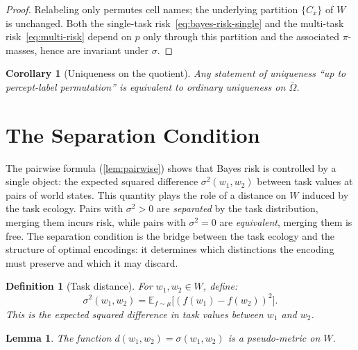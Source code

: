 \documentclass[12pt]{article}
\newtheorem{lemma}[theorem]{Lemma}
\newtheorem{corollary}[theorem]{Corollary}
\newtheorem{definition}[theorem]{Definition}
\newcommand{\sigmasq}{\sigma^2}
\newcommand{\E}{\mathbb{E}}
\newcommand{\Obar}{\bar{\Omega}}
\begin{document}
\begin{proof}
Relabeling only permutes cell names; the underlying partition $\{C_x\}$ of $W$ is unchanged. Both the single-task risk~\eqref{eq:bayes-risk-single} and the multi-task risk~\eqref{eq:multi-risk} depend on $p$ only through this partition and the associated $\pi$-masses, hence are invariant under $\sigma$.
\end{proof}

\begin{corollary}[Uniqueness on the quotient]\label{cor:quotient-unique}
Any statement of uniqueness ``up to percept-label permutation'' is equivalent to ordinary uniqueness on $\Obar$.
\end{corollary}

\section{The Separation Condition}\label{sec:separation}

The pairwise formula (\cref{lem:pairwise}) shows that Bayes risk is controlled by a single object: the expected squared difference $\sigmasq(w_1, w_2)$ between task values at pairs of world states. This quantity plays the role of a distance on $W$ induced by the task ecology. Pairs with $\sigmasq > 0$ are \emph{separated} by the task distribution, merging them incurs risk, while pairs with $\sigmasq = 0$ are \emph{equivalent}, merging them is free. The separation condition is the bridge between the task ecology and the structure of optimal encodings: it determines which distinctions the encoding must preserve and which it may discard.

\begin{definition}[Task distance]\label{def:task-distance}
For $w_1, w_2 \in W$, define:
\begin{equation}\label{eq:task-distance}
\sigmasq(w_1, w_2) = \E_{f \sim \mu}\bigl[(f(w_1) - f(w_2))^2\bigr].
\end{equation}
This is the expected squared difference in task values between $w_1$ and $w_2$.
\end{definition}

\begin{lemma}\label{lem:pseudometric}
The function $d(w_1, w_2) = \sigma(w_1, w_2)$ is a pseudo-metric on $W$.
\end{lemma}
\end{document}
